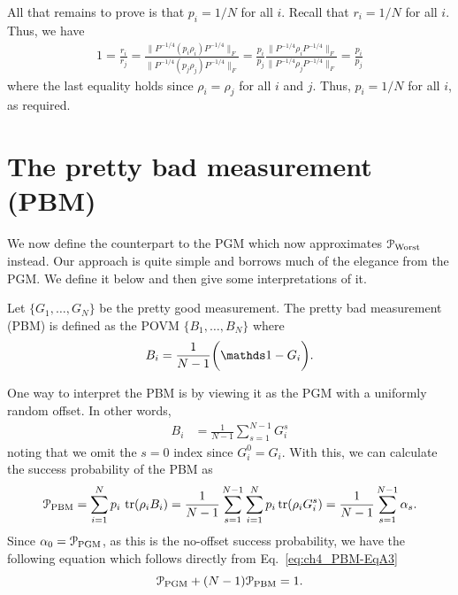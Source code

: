 All that remains to prove is that $p_i = 1/N$  for all $i$. 
Recall that $r_i = 1/N$ for all $i$. 
Thus, we have 
\begin{align} 
1
 = \frac{r_i}{r_j} 
 = \frac{\| P^{-1/4} (p_i \rho_i) P^{-1/4} \|_F}{\| P^{-1/4} (p_j \rho_j) P^{-1/4} \|_F} 
 = \frac{p_i}{p_j} \frac{\| P^{-1/4} \rho_i P^{-1/4} \|_F}{\| P^{-1/4} \rho_j P^{-1/4} \|_F} 
 = \frac{p_i}{p_j} 
\end{align}  
where the last equality holds since $\rho_i = \rho_j$ for all $i$ and $j$. 
Thus, $p_i = 1/N$ for all $i$, as required.

\section{The pretty bad measurement (PBM)} \label{sec:ch4_PBM-PBM}

We now define the counterpart to the PGM which now approximates $\mathcal{P}_{\mathrm{Worst}}$ instead. 
Our approach is quite simple and borrows much of the elegance from the PGM. 
We define it below and then give some interpretations of it. 
\begin{definition} 
Let $\{G_1, \ldots, G_N\}$ be the pretty good measurement. 
The pretty bad measurement (PBM) is defined as the POVM $\{B_1, \ldots, B_N\}$ where 
\begin{equation} 
B_i = \frac{1}{N-1} \bigg( \id - G_i \bigg).  
\end{equation} 
\end{definition} 

One way to interpret the PBM is by viewing it as the PGM with a uniformly random offset. 
In other words, 
\begin{align} 
B_i & = \frac{1}{N-1} \sum_{s=1}^{N-1} G^s_i 
\end{align} 
noting that we omit the $s=0$ index since $G_i^0 = G_i$.  
With this, we can calculate the success probability of the PBM as 
\begin{align} 
\mathcal{P}_{\mathrm{PBM}} 
= \sum_{i=1}^N p_i \, \tr(\rho_i B_i)
= \frac{1}{N-1} \sum_{s=1}^{N-1} \sum_{i=1}^N p_i \tr(\rho_i G^s_i)
= \frac{1}{N-1} \sum_{s=1}^{N-1} \alpha_s. \label{eq:ch4_PBM-JohnWick}
\end{align} 
Since $\alpha_0 = \mathcal{P}_{\mathrm{PGM}}$, as this is the no-offset success probability, we have the following equation which follows directly from Eq.~\eqref{eq:ch4_PBM-EqA3}  
\begin{equation}
\mathcal{P}_{\mathrm{PGM}} + (N-1) \mathcal{P}_{\mathrm{PBM}} = 1. \label{eq:ch4_PBM-PGM_PBM} 
\end{equation} 

